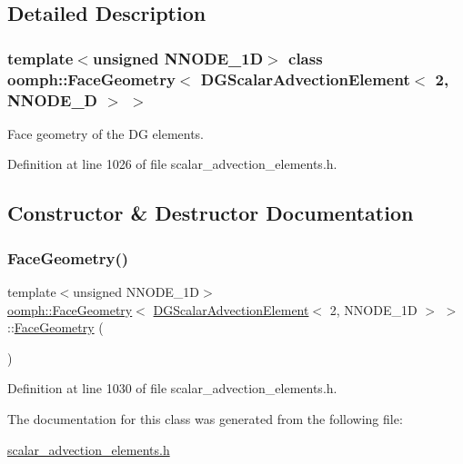 \subsection{Detailed Description}
\subsubsection*{template$<$unsigned N\+N\+O\+D\+E\+\_\+1D$>$\newline
class oomph\+::\+Face\+Geometry$<$ D\+G\+Scalar\+Advection\+Element$<$ 2, N\+N\+O\+D\+E\+\_\+D $>$ $>$}

Face geometry of the DG elements. 

Definition at line 1026 of file scalar\+\_\+advection\+\_\+elements.\+h.



\subsection{Constructor \& Destructor Documentation}
\mbox{\label{classoomph_1_1FaceGeometry_3_01DGScalarAdvectionElement_3_012_00_01NNODE__1D_01_4_01_4_aad0e4588171ce6434d31cf9481d2aa22}} 
\subsubsection{\texorpdfstring{Face\+Geometry()}{FaceGeometry()}}
{\footnotesize\ttfamily template$<$unsigned N\+N\+O\+D\+E\+\_\+1D$>$ \\
\hyperlink{classoomph_1_1FaceGeometry}{oomph\+::\+Face\+Geometry}$<$ \hyperlink{classoomph_1_1DGScalarAdvectionElement}{D\+G\+Scalar\+Advection\+Element}$<$ 2, N\+N\+O\+D\+E\+\_\+1D $>$ $>$\+::\hyperlink{classoomph_1_1FaceGeometry}{Face\+Geometry} (\begin{DoxyParamCaption}{ }\end{DoxyParamCaption})\hspace{0.3cm}{\ttfamily [inline]}}



Definition at line 1030 of file scalar\+\_\+advection\+\_\+elements.\+h.



The documentation for this class was generated from the following file\+:\begin{DoxyCompactItemize}
\item 
\hyperlink{scalar__advection__elements_8h}{scalar\+\_\+advection\+\_\+elements.\+h}\end{DoxyCompactItemize}
